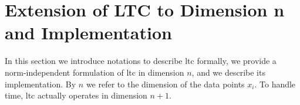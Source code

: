 \chapter{Extension of LTC to Dimension n and Implementation}
\label{chap:ltc-extension}

In this section we introduce notations to describe \acrshort{ltc} formally, we
provide a norm-independent formulation of \acrshort{ltc} in dimension $n$,
and we describe its implementation.
By $n$ we refer
to the dimension of the data points $x_i$. To handle time, \acrshort{ltc}
actually operates in dimension $n+1$. 





